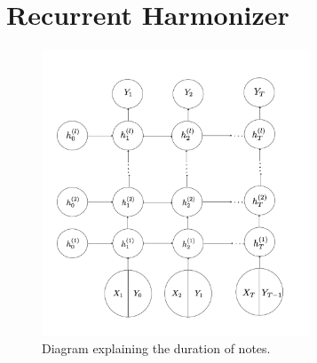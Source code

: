 \documentclass{article}
\begin{document}
\section*{Recurrent Harmonizer}


\begin{figure}[H]
\includegraphics[width=8cm]{Images/ManyToManyRnn.png}
\centering
\caption{Diagram explaining the duration of notes.}
\end{figure}
\end{document}
